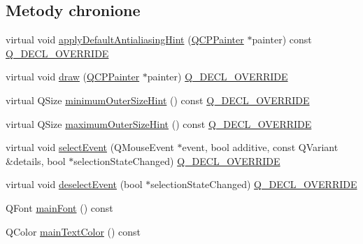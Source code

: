 \subsection*{Metody chronione}
\begin{DoxyCompactItemize}
\item 
virtual void \hyperlink{class_q_c_p_text_element_a91f2e4b4a639d9079e89a0030c7ed352}{apply\+Default\+Antialiasing\+Hint} (\hyperlink{class_q_c_p_painter}{Q\+C\+P\+Painter} $\ast$painter) const \hyperlink{qcustomplot_8hh_a42cc5eaeb25b85f8b52d2a4b94c56f55}{Q\+\_\+\+D\+E\+C\+L\+\_\+\+O\+V\+E\+R\+R\+I\+DE}
\item 
virtual void \hyperlink{class_q_c_p_text_element_ad1dae61ea77ae74841f3c2fb765fc88e}{draw} (\hyperlink{class_q_c_p_painter}{Q\+C\+P\+Painter} $\ast$painter) \hyperlink{qcustomplot_8hh_a42cc5eaeb25b85f8b52d2a4b94c56f55}{Q\+\_\+\+D\+E\+C\+L\+\_\+\+O\+V\+E\+R\+R\+I\+DE}
\item 
virtual Q\+Size \hyperlink{class_q_c_p_text_element_a47b8541f55ff520c557e0f27461f109e}{minimum\+Outer\+Size\+Hint} () const \hyperlink{qcustomplot_8hh_a42cc5eaeb25b85f8b52d2a4b94c56f55}{Q\+\_\+\+D\+E\+C\+L\+\_\+\+O\+V\+E\+R\+R\+I\+DE}
\item 
virtual Q\+Size \hyperlink{class_q_c_p_text_element_ae82475b50c10a5b3314d996d50ae536b}{maximum\+Outer\+Size\+Hint} () const \hyperlink{qcustomplot_8hh_a42cc5eaeb25b85f8b52d2a4b94c56f55}{Q\+\_\+\+D\+E\+C\+L\+\_\+\+O\+V\+E\+R\+R\+I\+DE}
\item 
virtual void \hyperlink{class_q_c_p_text_element_a8d696ea82fa7bf743e01858039c03525}{select\+Event} (Q\+Mouse\+Event $\ast$event, bool additive, const Q\+Variant \&details, bool $\ast$selection\+State\+Changed) \hyperlink{qcustomplot_8hh_a42cc5eaeb25b85f8b52d2a4b94c56f55}{Q\+\_\+\+D\+E\+C\+L\+\_\+\+O\+V\+E\+R\+R\+I\+DE}
\item 
virtual void \hyperlink{class_q_c_p_text_element_a9a631a9deb9d82089a9d52de1744accf}{deselect\+Event} (bool $\ast$selection\+State\+Changed) \hyperlink{qcustomplot_8hh_a42cc5eaeb25b85f8b52d2a4b94c56f55}{Q\+\_\+\+D\+E\+C\+L\+\_\+\+O\+V\+E\+R\+R\+I\+DE}
\item 
Q\+Font \hyperlink{class_q_c_p_text_element_add703a8b26d42bfe2378c3f51dd5c9ce}{main\+Font} () const 
\item 
Q\+Color \hyperlink{class_q_c_p_text_element_aed22b0d84634c10d81da006956ef5abb}{main\+Text\+Color} () const 
\end{DoxyCompactItemize}
